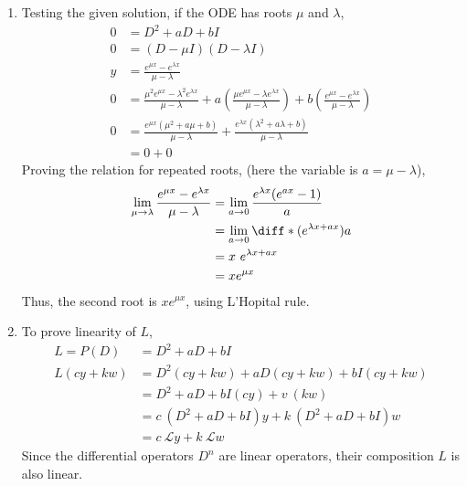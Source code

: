 \begin{enumerate}
    \item Testing the given solution, if the ODE has roots $ \mu $ and $ \lambda $,
          \begin{align}
              0 & =   D^{2} + aD + bI                                                   \\
              0 & = (D - \mu I)(D - \lambda I )                                         \\
              y & = \frac{e^{\mu x} - e^{\lambda x}}{\mu - \lambda}                     \\
              0 & = \frac{\mu ^{2}e^{\mu x} - \lambda ^{2}e^{\lambda x}}{\mu - \lambda}
              +  a\left( \frac{\mu e^{\mu x} - \lambda e^{\lambda x}}{\mu - \lambda} \right)
              +  b \left( \frac{e^{\mu x} - e^{\lambda x}}{\mu - \lambda} \right)       \\
              0 & = \frac{e^{\mu x}(\mu ^{2} + a\mu + b)}{\mu - \lambda}
              + \frac{e^{\lambda x}(\lambda ^{2} + a\lambda + b)}{\mu - \lambda}        \\
                & = 0 + 0
          \end{align}
          Proving the relation for repeated roots, (here the variable is $ a = \mu - \lambda$),
          \begin{align}
              \lim_{\mu \rightarrow \lambda} \frac{e^{\mu x} - e^{\lambda x}}{\mu - \lambda} & =
              \lim_{a \rightarrow 0} \frac{e^{\lambda x} (e^{ax} - 1)}{a}                                                                               \\
                                                                                             & = \lim_{a \rightarrow 0} \diff*{(e^{\lambda x + ax})}{a} \\
                                                                                             & = x\ e^{\lambda x + ax}                                  \\
                                                                                             & = xe^{\mu x}
          \end{align}
          Thus, the second root is $ xe^{\mu x} $, using L'Hopital rule.

    \item To prove linearity of $ L $,
          \begin{align}
              L = P(D)   & = D^{2} + aD + bI                                \\
              L(cy + kw) & = D^{2}(cy + kw) + aD(cy + kw) + bI(cy + kw)     \\
                         & = D^{2} + aD + bI (cy) + v\ (kw)                 \\
                         & = c\ (D^{2} + aD + bI)y + k\ (D^{2} + aD + bI) w \\
                         & = c\ \mathcal{L}y+k\ \mathcal{L}w
          \end{align}
          Since the differential operators $ D^{n} $ are linear operators, their composition
          $ L $ is also linear.
\end{enumerate}